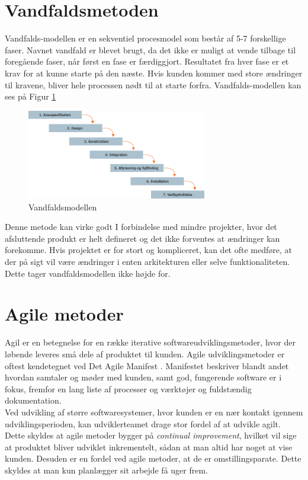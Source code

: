 \section{Vandfaldsmetoden}\label{sec:vandfald}
Vandfalds-modellen er en sekventiel procesmodel som består af 5-7 forskellige faser. 
Navnet vandfald er blevet brugt, da det ikke er muligt at vende tilbage til foregående faser, 
når først en fase er færdiggjort. Resultatet fra hver fase er et krav for at kunne starte på den næste. 
Hvis kunden kommer med store ændringer til kravene, bliver hele processen nødt til at starte forfra.  
Vandfalds-modellen kan ses på Figur \ref{fig:waterfallmodel} \\

\begin{figure}[h]
    \centering
    \includegraphics[width=0.7\textwidth]{figures/waterfall.png}
    \caption{Vandfaldsmodellen \cite{WaterfallModel}}
    \label{fig:waterfallmodel}
\end{figure}

Denne metode kan virke godt I forbindelse med mindre projekter, hvor det afsluttende produkt er 
helt defineret og det ikke forventes at ændringer kan forekomme. Hvis projektet er for stort og kompliceret,
kan det ofte medføre, at der på sigt vil være ændringer i enten arkitekturen eller selve funktionaliteten.
Dette tager vandfaldsmodellen ikke højde for.

\section{Agile metoder}\label{sec:agilemetoder}
Agil er en betegnelse for en række iterative softwareudviklingsmetoder, hvor der løbende leveres små dele af 
produktet til kunden. Agile udviklingsmetoder er oftest kendetegnet ved Det Agile Manifest \cite{AgileManifesto}.
Manifestet beskriver blandt andet hvordan samtaler og møder med kunden, samt god, fungerende software er i fokus, 
fremfor en lang liste af processer og værktøjer og fuldstændig dokumentation. \\

Ved udvikling af større softwaresystemer, hvor kunden er en nær kontakt igennem udviklingsperioden, kan udviklerteamet
drage stor fordel af at udvikle agilt. Dette skyldes at agile metoder bygger på \textit{continual improvement},
hvilket vil sige at produktet bliver udviklet inkrementelt, sådan at man altid har noget at vise kunden. Desuden er en fordel ved agile
metoder, at de er omstillingsparate. Dette skyldes at man kun planlægger sit arbejde få uger frem.